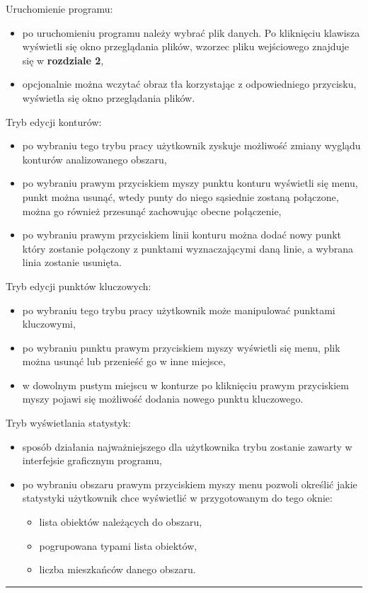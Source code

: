 \documentclass[a4paper,11pt]{article}
\newcommand{\linia}{\rule{\linewidth}{0.4mm}}
\begin{document}
Uruchomienie programu:
\begin{itemize}
\item po uruchomieniu programu należy wybrać plik danych. Po kliknięciu klawisza wyświetli się okno przeglądania plików, wzorzec pliku wejściowego znajduje się w \textbf{rozdziale 2},
\item opcjonalnie można wczytać obraz tła korzystając z odpowiedniego przycisku, wyświetla się okno przeglądania plików.
\end{itemize}
Tryb edycji konturów:
\begin{itemize}
\item po wybraniu tego trybu pracy użytkownik zyskuje możliwość zmiany wyglądu konturów analizowanego obszaru,
\item po wybraniu prawym przyciskiem myszy punktu konturu wyświetli się menu, punkt można usunąć, wtedy punty do niego sąsiednie zostaną połączone, można go również przesunąć zachowując obecne połączenie,
\item po wybraniu prawym przyciskiem linii konturu można dodać nowy punkt który zostanie połączony z punktami wyznaczającymi daną linie, a wybrana linia zostanie usunięta.
\end{itemize}
Tryb edycji punktów kluczowych:
\begin{itemize}
\item po wybraniu tego trybu pracy użytkownik może manipulować punktami kluczowymi,
\item po wybraniu punktu prawym przyciskiem myszy wyświetli się menu, plik można usunąć lub przenieść go w inne miejsce,
\item w dowolnym pustym miejscu w konturze po kliknięciu prawym przyciskiem myszy pojawi się możliwość dodania nowego punktu kluczowego.
\end{itemize}
\pagebreak
Tryb wyświetlania statystyk:
\begin{itemize}
\item sposób działania najważniejszego dla użytkownika trybu zostanie zawarty w interfejsie graficznym programu,
\item po wybraniu obszaru prawym przyciskiem myszy menu pozwoli określić jakie statystyki użytkownik chce wyświetlić w przygotowanym do tego oknie:
\begin{itemize}
\item lista obiektów należących do obszaru,
\item pogrupowana typami lista obiektów,
\item liczba mieszkańców danego obszaru.
\end{itemize}
\end{itemize}
\noindent\linia
\end{document}
